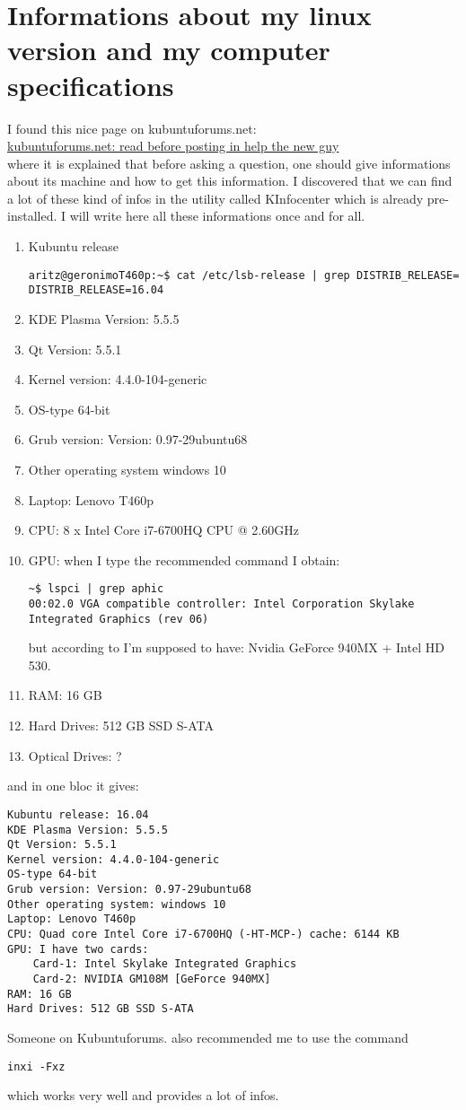 \documentclass[11pt,a4paper]{article} %
\begin{document}
\section{Informations about my linux version and my computer specifications}
I found this nice page on kubuntuforums.net:\\
\href{https://www.kubuntuforums.net/showthread.php/47924-gt-gt-gt-PLEASE-READ-BEFORE-POSTING-IN-HELP-THE-NEW-GUY-lt-lt-lt}{kubuntuforums.net: read before posting in help the new guy}\\
where it is explained that before asking a question, one should give informations about its machine and how to get this information. I discovered that we can find a lot of these kind of infos in the utility called KInfocenter which is already pre-installed.
I will write here all these informations once and for all.\\
\begin{enumerate}
\item Kubuntu release
\begin{verbatim}
aritz@geronimoT460p:~$ cat /etc/lsb-release | grep DISTRIB_RELEASE=
DISTRIB_RELEASE=16.04
\end{verbatim}
\item KDE Plasma Version: 5.5.5 
\item Qt Version: 5.5.1
\item Kernel version: 4.4.0-104-generic
\item OS-type 64-bit
\item Grub version: Version: 0.97-29ubuntu68
\item Other operating system windows 10
\item Laptop: Lenovo T460p
\item CPU: 8 x Intel Core i7-6700HQ CPU @ 2.60GHz
\item GPU: when I type the recommended command I obtain:
\begin{verbatim}
~$ lspci | grep aphic
00:02.0 VGA compatible controller: Intel Corporation Skylake Integrated Graphics (rev 06)
\end{verbatim}
but according to I'm supposed to have: Nvidia GeForce 940MX + Intel HD 530.
\item RAM: 16 GB
\item Hard Drives: 512 GB SSD S-ATA 
\item Optical Drives: ?
\end{enumerate}
and in one bloc it gives:
\begin{verbatim}
Kubuntu release: 16.04
KDE Plasma Version: 5.5.5
Qt Version: 5.5.1
Kernel version: 4.4.0-104-generic
OS-type 64-bit
Grub version: Version: 0.97-29ubuntu68
Other operating system: windows 10
Laptop: Lenovo T460p
CPU: Quad core Intel Core i7-6700HQ (-HT-MCP-) cache: 6144 KB
GPU: I have two cards:
	Card-1: Intel Skylake Integrated Graphics 
	Card-2: NVIDIA GM108M [GeForce 940MX] 
RAM: 16 GB
Hard Drives: 512 GB SSD S-ATA 		
\end{verbatim}
Someone on Kubuntuforums. also recommended me to use the command
\begin{verbatim}
inxi -Fxz
\end{verbatim}
which works very well and provides a lot of infos.
\end{document}
